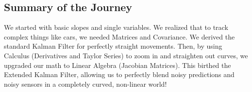 \documentclass[
]{article}
\begin{document}
\subsection{Summary of the Journey}\label{summary-of-the-journey}

We started with basic slopes and single variables. We realized that to
track complex things like cars, we needed Matrices and Covariance. We
derived the standard Kalman Filter for perfectly straight movements.
Then, by using Calculus (Derivatives and Taylor Series) to zoom in and
straighten out curves, we upgraded our math to Linear Algebra (Jacobian
Matrices). This birthed the Extended Kalman Filter, allowing us to
perfectly blend noisy predictions and noisy sensors in a completely
curved, non-linear world!
\end{document}
